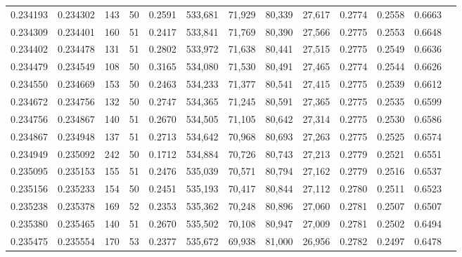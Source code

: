 \begin{tabular}{rrrrrrrrrrrrr}
0.234193 & 0.234302 &   143 &  50 &                                     0.2591 & 533,681 &  71,929 &  80,339 &  27,617 & 0.2774 & 0.2558 & 0.6663 \\
0.234309 & 0.234401 &   160 &  51 &                                     0.2417 & 533,841 &  71,769 &  80,390 &  27,566 & 0.2775 & 0.2553 & 0.6648 \\
0.234402 & 0.234478 &   131 &  51 &                                     0.2802 & 533,972 &  71,638 &  80,441 &  27,515 & 0.2775 & 0.2549 & 0.6636 \\
0.234479 & 0.234549 &   108 &  50 &                                     0.3165 & 534,080 &  71,530 &  80,491 &  27,465 & 0.2774 & 0.2544 & 0.6626 \\
0.234550 & 0.234669 &   153 &  50 &                                     0.2463 & 534,233 &  71,377 &  80,541 &  27,415 & 0.2775 & 0.2539 & 0.6612 \\
0.234672 & 0.234756 &   132 &  50 &                                     0.2747 & 534,365 &  71,245 &  80,591 &  27,365 & 0.2775 & 0.2535 & 0.6599 \\
0.234756 & 0.234867 &   140 &  51 &                                     0.2670 & 534,505 &  71,105 &  80,642 &  27,314 & 0.2775 & 0.2530 & 0.6586 \\
0.234867 & 0.234948 &   137 &  51 &                                     0.2713 & 534,642 &  70,968 &  80,693 &  27,263 & 0.2775 & 0.2525 & 0.6574 \\
0.234949 & 0.235092 &   242 &  50 &                                     0.1712 & 534,884 &  70,726 &  80,743 &  27,213 & 0.2779 & 0.2521 & 0.6551 \\
0.235095 & 0.235153 &   155 &  51 &                                     0.2476 & 535,039 &  70,571 &  80,794 &  27,162 & 0.2779 & 0.2516 & 0.6537 \\
0.235156 & 0.235233 &   154 &  50 &                                     0.2451 & 535,193 &  70,417 &  80,844 &  27,112 & 0.2780 & 0.2511 & 0.6523 \\
0.235238 & 0.235378 &   169 &  52 &                                     0.2353 & 535,362 &  70,248 &  80,896 &  27,060 & 0.2781 & 0.2507 & 0.6507 \\
0.235380 & 0.235465 &   140 &  51 &                                     0.2670 & 535,502 &  70,108 &  80,947 &  27,009 & 0.2781 & 0.2502 & 0.6494 \\
0.235475 & 0.235554 &   170 &  53 &                                     0.2377 & 535,672 &  69,938 &  81,000 &  26,956 & 0.2782 & 0.2497 & 0.6478 \\

\end{tabular}

